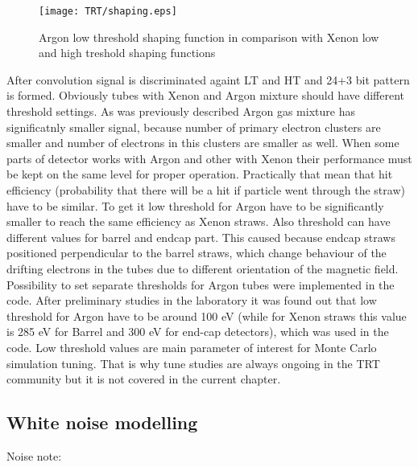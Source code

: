 \begin{figure}
\begin{center}
 \texttt{[image: TRT/shaping.eps]}
\caption{Argon low threshold shaping function in comparison with Xenon low and high treshold shaping functions}
\label{fig:shaping}
\end{center}
\end{figure}


After convolution signal is discriminated againt LT and HT and 24+3 bit pattern is formed.
Obviously tubes with Xenon and Argon mixture should have different threshold settings.
As was previously described Argon gas mixture has significatnly smaller signal, because
number of primary electron clusters are smaller and number of electrons in this clusters are smaller as well.
When some parts of detector works with Argon and other with Xenon their performance must be kept on the same level for
proper operation. Practically that mean that hit efficiency (probability that there will be a hit if particle went through the straw) have to be 
similar. To get it low threshold for Argon have to be significantly smaller to reach the same efficiency as Xenon straws.
Also threshold can have different values for barrel and endcap part. This caused because endcap straws positioned perpendicular to the barrel straws, 
which change behaviour of the drifting electrons in the tubes due to different orientation of the magnetic field.
Possibility to set separate thresholds for Argon tubes were implemented in the code.
After preliminary studies in the laboratory it was found out that low threshold for Argon have to be around 100 eV 
(while for Xenon straws this value is 285 eV for Barrel and 300 eV for end-cap detectors), which was used in the code.
Low threshold values are main parameter of interest for Monte Carlo simulation tuning. That is why tune studies are always ongoing 
in the TRT community but it is not covered in the current chapter.

\subsection{White noise modelling}

Noise note:~\cite{Kittelmann:987854}

